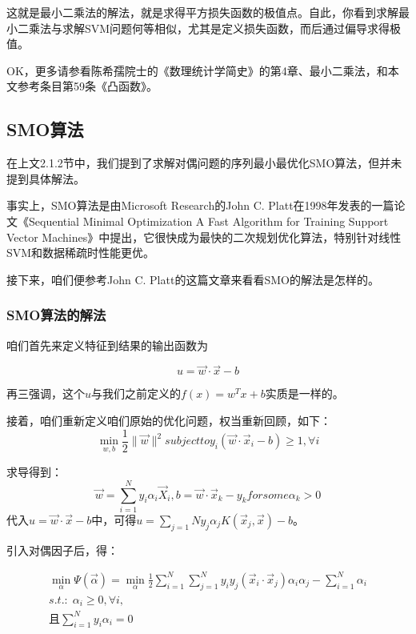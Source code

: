 \documentclass[a4paper,12pt]{article}
\begin{document}
这就是最小二乘法的解法，就是求得平方损失函数的极值点。自此，你看到求解最小二乘法与求解SVM问题何等相似，尤其是定义损失函数，而后通过偏导求得极值。

OK，更多请参看陈希孺院士的《数理统计学简史》的第4章、最小二乘法，和本文参考条目第59条《凸函数》。

\subsection{SMO算法}

在上文2.1.2节中，我们提到了求解对偶问题的序列最小最优化SMO算法，但并未提到具体解法。

事实上，SMO算法是由Microsoft Research的John C. Platt在1998年发表的一篇论文《Sequential Minimal Optimization A Fast Algorithm for Training Support Vector Machines》中提出，它很快成为最快的二次规划优化算法，特别针对线性SVM和数据稀疏时性能更优。

接下来，咱们便参考John C. Platt的这篇文章来看看SMO的解法是怎样的。

\subsubsection{SMO算法的解法}

咱们首先来定义特征到结果的输出函数为

\begin{equation}
  u=\vec w \cdot \vec x-b
\end{equation}

再三强调，这个$u$与我们之前定义的$f(x)=w^Tx+b$实质是一样的。

接着，咱们重新定义咱们原始的优化问题，权当重新回顾，如下：
\begin{equation}
  \min_{w,b}\frac{1}{2}\|\vec w\|^2 subject to y_i(\vec w \cdot \vec x_i-b)\geq 1,\forall i
\end{equation}

求导得到：
\begin{equation}
  \vec w =\sum_{i=1}^Ny_i\alpha_i\vec X_i,b=\vec w \cdot \vec x_k-y_k for some \alpha_k>0
\end{equation}
代入$ u=\vec w \cdot \vec x-b$中，可得$u=\sum_{j=1}{N}y_j\alpha_jK(\vec x_j,\vec x)-b$。

引入对偶因子后，得：

\begin{equation}
  \begin{split}
    \min_\alpha\Psi(\vec\alpha)=\min_\alpha\frac{1}{2}\sum_{i=1}^N\sum_{j=1}^Ny_iy_j(\vec x_i\cdot \vec x_j)\alpha_i\alpha_j-\sum_{i=1}^N\alpha_i\\
    s.t.:\;\alpha_i\geq0,\forall i,\\
    \text{且}\sum_{i=1}^Ny_i\alpha_i=0
  \end{split}
\end{equation}
\end{document}
